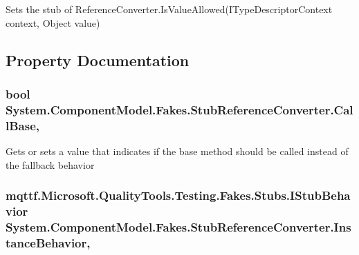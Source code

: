 Sets the stub of Reference\-Converter.\-Is\-Value\-Allowed(\-I\-Type\-Descriptor\-Context context, Object value)



\subsection{Property Documentation}
\hypertarget{class_system_1_1_component_model_1_1_fakes_1_1_stub_reference_converter_aad562ec3126e385d04dc6f7bee979710}{
\subsubsection[{Call\-Base}]{\setlength{\rightskip}{0pt plus 5cm}bool System.\-Component\-Model.\-Fakes.\-Stub\-Reference\-Converter.\-Call\-Base\hspace{0.3cm}{\ttfamily [get]}, {\ttfamily [set]}}}\label{class_system_1_1_component_model_1_1_fakes_1_1_stub_reference_converter_aad562ec3126e385d04dc6f7bee979710}


Gets or sets a value that indicates if the base method should be called instead of the fallback behavior

\hypertarget{class_system_1_1_component_model_1_1_fakes_1_1_stub_reference_converter_a92f24aba2edf3cd02a33cfc5752b2481}{
\subsubsection[{Instance\-Behavior}]{\setlength{\rightskip}{0pt plus 5cm}mqttf.\-Microsoft.\-Quality\-Tools.\-Testing.\-Fakes.\-Stubs.\-I\-Stub\-Behavior System.\-Component\-Model.\-Fakes.\-Stub\-Reference\-Converter.\-Instance\-Behavior\hspace{0.3cm}{\ttfamily [get]}, {\ttfamily [set]}}}\label{class_system_1_1_component_model_1_1_fakes_1_1_stub_reference_converter_a92f24aba2edf3cd02a33cfc5752b2481}


